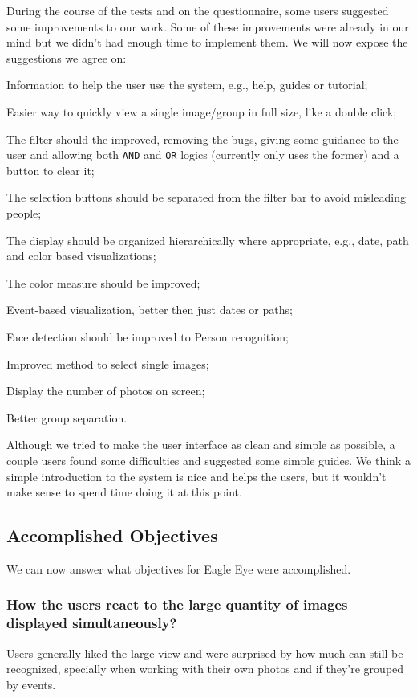 During the course of the tests and on the questionnaire, some users suggested some improvements to our work. Some of these improvements were already in our mind but we didn't had enough time to implement them. We will now expose the suggestions we agree on:

\begin{myitemize}
	\item Information to help the user use the system, e.g., help, guides or tutorial;
	\item Easier way to quickly view a single image/group in full size, like a double click;
	\item The filter should the improved, removing the bugs, giving some guidance to the user and allowing both \texttt{AND} and \texttt{OR} logics (currently only uses the former) and a button to clear it;
	\item The selection buttons should be separated from the filter bar to avoid misleading people;
	\item The display should be organized hierarchically where appropriate, e.g., date, path and color based visualizations;
	\item The color measure should be improved;
	\item Event-based visualization, better then just dates or paths;
	\item Face detection should be improved to Person recognition;
	\item Improved method to select single images;
	\item Display the number of photos on screen;
	\item Better group separation.
\end{myitemize}

Although we tried to make the user interface as clean and simple as possible, a couple users found some difficulties and suggested some simple guides. We think a simple introduction to the system is nice and helps the users, but it wouldn't make sense to spend time doing it at this point.


\subsection{Accomplished Objectives} 

We can now answer what objectives for Eagle Eye were accomplished. 

\subsubsection{How the users react to the large quantity of images displayed simultaneously?}
Users generally liked the large view and were surprised by how much can still be recognized, specially when working with their own photos and if they're grouped by events. 

